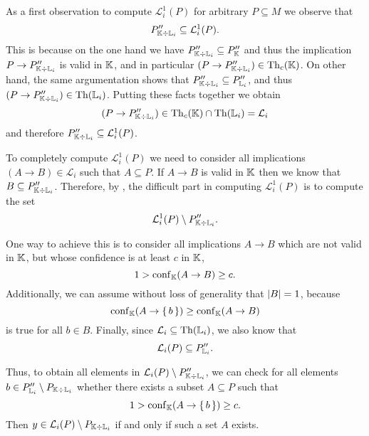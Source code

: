 As a first observation to compute $\mathcal{L}_{i}^{1}(P)$ for arbitrary $P \subseteq M$
we observe that
\begin{equation}
  \label{eq:41}
  P_{{\mathbb{K}} \div {\ensuremath{\mathbb{L}}}_{i}}'' \subseteq \mathcal{L}_{i}^{1}(P).
\end{equation}
This is because on the one hand we have $P_{{\mathbb{K}} \div {\ensuremath{\mathbb{L}}}_{i}}'' \subseteq P_{{\mathbb{K}}}''$ and thus the implication $P \to P_{{\mathbb{K}} \div {\ensuremath{\mathbb{L}}}_{i}}''$ is valid in ${\mathbb{K}}$, and in particular $(P \to P_{{\mathbb{K}} \div {\ensuremath{\mathbb{L}}}_{i}}'') \in \operatorname{Th}_{c}({\mathbb{K}})$.
On other hand, the same argumentation shows that $P_{{\mathbb{K}} \div {\ensuremath{\mathbb{L}}}_{i}}'' \subseteq
P_{{\mathbb{L}}_{i}}''$, and thus $(P \to P_{{\mathbb{K}} \div {\ensuremath{\mathbb{L}}}_{i}}'') \in \operatorname{Th}({\mathbb{L}}_{i})$.
Putting these facts together we obtain
\begin{equation*}
  (P \to P_{{\mathbb{K}} \div {\ensuremath{\mathbb{L}}}_{i}}'') \in \operatorname{Th}_{c}({\mathbb{K}}) \cap \operatorname{Th}({\mathbb{L}}_{i}) = \mathcal{L}_{i}
\end{equation*}
and therefore $P_{{\mathbb{K}} \div {\ensuremath{\mathbb{L}}}_{i}}'' \subseteq \mathcal{L}_{i}^{1}(P)$.

To completely compute $\mathcal{L}_{i}^{1}(P)$ we need to consider all implications $(A
\to B) \in \mathcal{L}_{i}$ such that $A \subseteq P$.  If $A \to B$ is valid in ${\mathbb{K}}$
then we know that $B \subseteq P_{{\mathbb{K}} \div {\ensuremath{\mathbb{L}}}_{i}}''$.  Therefore, by ,
the difficult part in computing $\mathcal{L}_{i}^{1}(P)$ is to compute the set
\begin{equation*}
  \mathcal{L}_{i}^{1}(P) \setminus P_{{\mathbb{K}} \div {\ensuremath{\mathbb{L}}}_{i}}''.
\end{equation*}

One way to achieve this is to consider all implications $A \to B$ which are not valid in
${\mathbb{K}}$, but whose confidence is at least $c$ in ${\mathbb{K}}$, \ie
\begin{equation*}
  1 > \operatorname{conf}_{{\mathbb{K}}}(A \to B) \ge c.
\end{equation*}
Additionally, we can assume without loss of generality that $\lvert B\rvert = 1$, because
\begin{equation*}
  \operatorname{conf}_{{\mathbb{K}}}(A \to {\ensuremath{\{\, b \,\}}}) \ge \operatorname{conf}_{{\mathbb{K}}}(A \to B)
\end{equation*}
is true for all $b \in B$.  Finally, since $\mathcal{L}_{i} \subseteq \operatorname{Th}({\mathbb{L}}_{i})$, we
also know that
\begin{equation*}
  \mathcal{L}_{i}(P) \subseteq P_{{\mathbb{L}}_{i}}''.
\end{equation*}

Thus, to obtain all elements in $\mathcal{L}_{i}(P) \setminus P_{{\mathbb{K}} \div {\ensuremath{\mathbb{L}}}_{i}}''$, we can check for all elements $b \in P_{{\mathbb{L}}_{i}}'' \setminus P_{{\mathbb{K}}
  \div {\ensuremath{\mathbb{L}}}_{i}}$ whether there exists a subset $A \subseteq P$ such that
\begin{equation*}
  1 > \operatorname{conf}_{{\mathbb{K}}}(A \to {\ensuremath{\{\, b \,\}}}) \ge c.
\end{equation*}
Then $y \in \mathcal{L}_{i}(P) \setminus P_{{\mathbb{K}} \div {\ensuremath{\mathbb{L}}}_{i}}$ if and only if such a
set $A$ exists.

